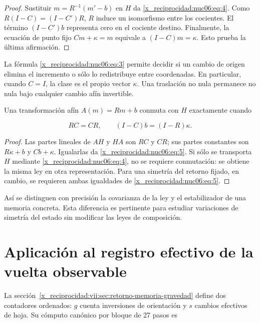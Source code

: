\begin{proof}
Sustituir \(m=R^{-1}(m'-b)\) en \(H\) da \eqref{x_reciprocidad:nuc06:eq:4}. Como \(R(I-C)=(I-C')R\), \(R\) induce un isomorfismo entre los cocientes. El término \((I-C')b\) representa cero en el cociente destino. Finalmente, la ecuación de punto fijo \(Cm+\kappa=m\) equivale a \((I-C)m=\kappa\). Esto prueba la última afirmación.
\end{proof}

La fórmula \eqref{x_reciprocidad:nuc06:eq:3} permite decidir si un cambio de origen elimina el incremento o sólo lo redistribuye entre coordenadas. En particular, cuando \(C=I\), la clase es el propio vector \(\kappa\). Una traslación no nula permanece no nula bajo cualquier cambio afín invertible.

\begin{proposition}

Una transformación afín \(A(m)=Rm+b\) conmuta con \(H\) exactamente cuando

\begin{equation}
RC=CR,\qquad (I-C)b=(I-R)\kappa.
\label{x_reciprocidad:nuc06:eq:5}
\end{equation}
\end{proposition}

\begin{proof}
Las partes lineales de \(AH\) y \(HA\) son \(RC\) y \(CR\); sus partes constantes son \(R\kappa+b\) y \(Cb+\kappa\). Igualarlas da \eqref{x_reciprocidad:nuc06:eq:5}. Si sólo se transporta \(H\) mediante \eqref{x_reciprocidad:nuc06:eq:4}, no se requiere conmutación: se obtiene la misma ley en otra representación. Para una simetría del retorno fijado, en cambio, se requieren ambas igualdades de \eqref{x_reciprocidad:nuc06:eq:5}.
\end{proof}

Así se distinguen con precisión la covarianza de la ley y el estabilizador de una memoria concreta. Esta diferencia es pertinente para estudiar variaciones de simetría del estado sin modificar las leyes de composición.

\section{Aplicación al registro efectivo de la vuelta observable}

La sección~\ref{x_reciprocidad:vii:sec:retorno-memoria-gravedad} define dos contadores ordenados: \(g\) cuenta inversiones de orientación y \(s\) cambios efectivos de hoja. Su cómputo canónico por bloque de 27 pasos es

